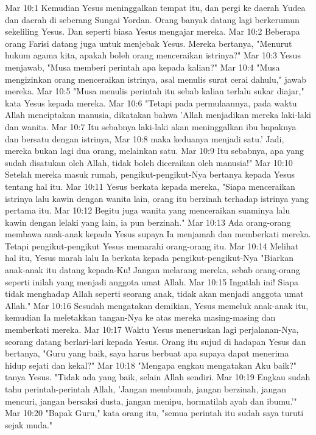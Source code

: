 Mar 10:1  Kemudian Yesus meninggalkan tempat itu, dan pergi ke daerah Yudea dan daerah di seberang Sungai Yordan. Orang banyak datang lagi berkerumun sekeliling Yesus. Dan seperti biasa Yesus mengajar mereka.
Mar 10:2  Beberapa orang Farisi datang juga untuk menjebak Yesus. Mereka bertanya, "Menurut hukum agama kita, apakah boleh orang menceraikan istrinya?"
Mar 10:3  Yesus menjawab, "Musa memberi perintah apa kepada kalian?"
Mar 10:4  "Musa mengizinkan orang menceraikan istrinya, asal menulis surat cerai dahulu," jawab mereka.
Mar 10:5  "Musa menulis perintah itu sebab kalian terlalu sukar diajar," kata Yesus kepada mereka.
Mar 10:6  "Tetapi pada permulaannya, pada waktu Allah menciptakan manusia, dikatakan bahwa 'Allah menjadikan mereka laki-laki dan wanita.
Mar 10:7  Itu sebabnya laki-laki akan meninggalkan ibu bapaknya dan bersatu dengan istrinya,
Mar 10:8  maka keduanya menjadi satu.' Jadi, mereka bukan lagi dua orang, melainkan satu.
Mar 10:9  Itu sebabnya, apa yang sudah disatukan oleh Allah, tidak boleh diceraikan oleh manusia!"
Mar 10:10  Setelah mereka masuk rumah, pengikut-pengikut-Nya bertanya kepada Yesus tentang hal itu.
Mar 10:11  Yesus berkata kepada mereka, "Siapa menceraikan istrinya lalu kawin dengan wanita lain, orang itu berzinah terhadap istrinya yang pertama itu.
Mar 10:12  Begitu juga wanita yang menceraikan suaminya lalu kawin dengan lelaki yang lain, ia pun berzinah."
Mar 10:13  Ada orang-orang membawa anak-anak kepada Yesus supaya Ia menjamah dan memberkati mereka. Tetapi pengikut-pengikut Yesus memarahi orang-orang itu.
Mar 10:14  Melihat hal itu, Yesus marah lalu Ia berkata kepada pengikut-pengikut-Nya "Biarkan anak-anak itu datang kepada-Ku! Jangan melarang mereka, sebab orang-orang seperti inilah yang menjadi anggota umat Allah.
Mar 10:15  Ingatlah ini! Siapa tidak menghadap Allah seperti seorang anak, tidak akan menjadi anggota umat Allah."
Mar 10:16  Sesudah mengatakan demikian, Yesus memeluk anak-anak itu, kemudian Ia meletakkan tangan-Nya ke atas mereka masing-masing dan memberkati mereka.
Mar 10:17  Waktu Yesus meneruskan lagi perjalanan-Nya, seorang datang berlari-lari kepada Yesus. Orang itu sujud di hadapan Yesus dan bertanya, "Guru yang baik, saya harus berbuat apa supaya dapat menerima hidup sejati dan kekal?"
Mar 10:18  "Mengapa engkau mengatakan Aku baik?" tanya Yesus. "Tidak ada yang baik, selain Allah sendiri.
Mar 10:19  Engkau sudah tahu perintah-perintah Allah, 'Jangan membunuh, jangan berzinah, jangan mencuri, jangan bersaksi dusta, jangan menipu, hormatilah ayah dan ibumu.'"
Mar 10:20  "Bapak Guru," kata orang itu, "semua perintah itu sudah saya turuti sejak muda."
